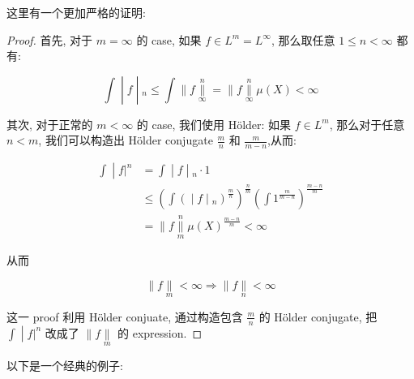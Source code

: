这里有一个更加严格的证明:

\begin{proof}

首先, 对于 \(m = \infty\) 的 case, 如果 \(f \in L^{m} = L^{\infty}\), 那么取任意 \(1 \leq n < \infty\) 都有:

\[\left. \int \middle| f \middle| {}_{n} \leq \int \parallel f\underset{\infty}{\overset{n}{\parallel}} = \parallel f\underset{\infty}{\overset{n}{\parallel}}\mu(X) < \infty \right.\]

其次, 对于正常的 \(m < \infty\) 的 case, 我们使用 Hölder: 如果 \(f \in L^{m}\), 那么对于任意 \(n < m\), 我们可以构造出 Hölder conjugate \(\frac{m}{n}\) 和 \(\frac{m}{m - n}\),从而:

\[\begin{matrix}
\left. \int \middle| f|^{n} \right. & \left. = \int \middle| f \middle| {}_{n} \cdot 1 \right. \\
 & \left. \leq (\int( \middle| f \middle| {}_{n})^{\frac{m}{n}})^{\frac{n}{m}}(\int 1^{\frac{m}{m - n}})^{\frac{m - n}{m}} \right. \\
 & {= \parallel f\underset{m}{\overset{n}{\parallel}}\mu(X)^{\frac{m - n}{m}} < \infty}
\end{matrix}\]

从而

\[\parallel f\underset{m}{\parallel} < \infty\Longrightarrow \parallel f\underset{n}{\parallel} < \infty\]

这一 proof 利用 Hölder conjuate, 通过构造包含 \(\frac{m}{n}\) 的 Hölder conjugate, 把 \(\left. \int \middle| f|^{n} \right.\) 改成了 \(\parallel f\underset{m}{\parallel}\) 的 expression.

\end{proof}

以下是一个经典的例子:

